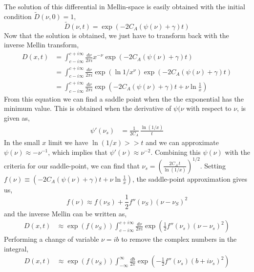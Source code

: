 \documentclass[main.tex]{subfiles}
\begin{document}
The solution of this differential in Mellin-space is easily obtained with the initial condition \(\tilde D(\nu,0) = 1\),
\begin{equation}
    \tilde D(\nu,t) = \exp \left(-2C_A (\psi(\nu)+\gamma)t\right)
\end{equation}
Now that the solution is obtained, we just have to transform back with the inverse Mellin transform,
\begin{align}
    D(x,t) &= \int_{c-i\infty}^{c+i\infty}\frac{d\nu}{2\pi i} x^{-\nu} \exp \left(-2C_A (\psi(\nu)+\gamma)t\right) \nonumber \\
    &= \int_{c-i\infty}^{c+i\infty}\frac{d\nu}{2\pi i} \exp\left(\ln 1/x^\nu\right) \exp \left(-2C_A (\psi(\nu)+\gamma)t\right) \nonumber \\
    &= \int_{c-i\infty}^{c+i\infty}\frac{d\nu}{2\pi i} \exp \left(-2C_A (\psi(\nu)+\gamma)t + \nu \ln \frac{1}{x} \right)
\end{align}
From this equation we can find a saddle point when the the exponential has the minimum value. This is obtained when the derivative of \(\psi(\nu\) with respect to \(\nu\), is given as,
\begin{align}\label{eqn: DGLAP_mellin_solution_minimum}
    \psi'(\nu_s) &= \frac{1}{2C_A}\,\frac{\ln (1/x)}{t}
\end{align}
In the small \(x\) limit we have \(\ln (1/x) >> t\) and we can approximate \(\psi(\nu) \approx -\nu^{-1}\), which implies that \(\psi'(\nu) \approx \nu^{-2}\). Combining this \(\psi(\nu)\) with the criteria for our saddle-point, we can find that \(\nu_s = (\frac{2C_A\,t}{\ln(1/x)})^{1/2}\). Setting \(f(\nu) \equiv \left(-2C_A (\psi(\nu)+\gamma)t + \nu \ln \frac{1}{x}\right) \), the saddle-point approximation gives us, 
\begin{equation}
    f(\nu) \approx f(\nu_S) + \frac{1}{2} f''(\nu_S)(\nu-\nu_S)^2
\end{equation}
and the inverse Mellin can be written as,
\begin{align}
    D(x,t) &\approx \exp \left(f(\nu_S) \right) \int_{c-i\infty}^{c+i\infty}\frac{d\nu}{2\pi i} \exp \left(\frac{1}{2} f''(\nu_s)(\nu-\nu_s)^2 \right) 
\end{align}
Performing a change of variable \(\nu = i b\) to remove the complex numbers in the integral, 
\begin{align}
    D(x,t) &\approx \exp \left(f(\nu_S) \right) \int_{-\infty}^{\infty}\frac{db}{2\pi} \exp \left(-\frac{1}{2} f''(\nu_s)(b+i\nu_s)^2 \right) 
\end{align}
\end{document}
